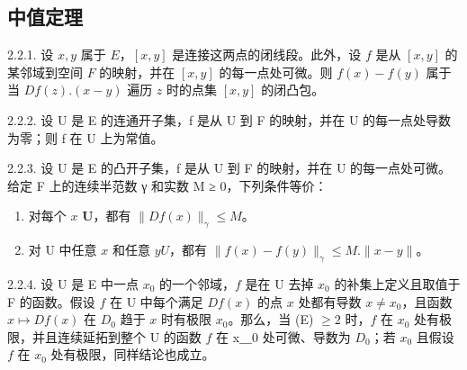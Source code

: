\subsection{中值定理}

2.2.1. 设 \(x,y\) 属于 \(E\)，\([x,y]\) 是连接这两点的闭线段。此外，设 \(f\) 是从 \([x,y]\) 的某邻域到空间 \(F\) 的映射，并在 \([x,y]\) 的每一点处可微。则 \(f(x)-f(y)\) 属于当 \(Df(z).(x-y)\) 遍历 \(z\) 时的点集 \([x,y]\) 的闭凸包。

2.2.2. 设 U 是 E 的连通开子集，f 是从 U 到
F 的映射，并在 U 的每一点处导数为零；则 f 在 U 上为常值。

2.2.3. 设 U 是 E 的凸开子集，f 是从 U 到 F 的映射，并在 U 的每一点处可微。给定 F 上的连续半范数 γ 和实数 M ≥ 0，下列条件等价：

\begin{enumerate}
\def\labelenumi{(\roman{enumi})}
\item
  对每个 \(x\)  \(\mathbf{U}\)，都有 \(\| Df(x)\|_{\gamma}\leqslant M\)。
\item
  对 U 中任意 \(x\) 和任意 \(y\)\(U\)，都有 \(\| f(x) - f(y)\|_{\gamma} \leqslant M . \| x - y\| \)。
\end{enumerate}

2.2.4. 设 U 是 E 中一点 \(x_0\) 的一个邻域，\(f\) 是在 U 去掉 \(x_0\) 的补集上定义且取值于 F 的函数。假设 \(f\) 在 U 中每个满足 \(Df(x)\) 的点 \(x\) 处都有导数 \(x \neq x_0\)，且函数 \(x \mapsto Df(x)\) 在 \(D_0\) 趋于 \(x\) 时有极限 \(x_0\)。那么，当  (E) \(\geqslant 2\) 时，\(f\) 在 \(x_0\) 处有极限，并且连续延拓到整个 U 的函数 \(f\) 在 x＿0 处可微、导数为 \(D_0\)；若 \(x_0\) 且假设 \(f\) 在 \(x_0\) 处有极限，同样结论也成立。

